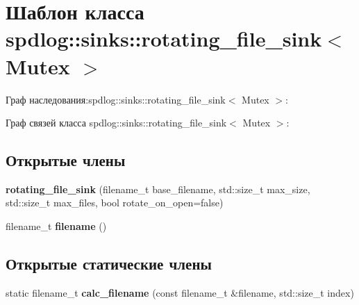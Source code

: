 \hypertarget{classspdlog_1_1sinks_1_1rotating__file__sink}{}\section{Шаблон класса spdlog\+:\+:sinks\+:\+:rotating\+\_\+file\+\_\+sink$<$ Mutex $>$}
\label{classspdlog_1_1sinks_1_1rotating__file__sink}


Граф наследования\+:spdlog\+:\+:sinks\+:\+:rotating\+\_\+file\+\_\+sink$<$ Mutex $>$\+:


Граф связей класса spdlog\+:\+:sinks\+:\+:rotating\+\_\+file\+\_\+sink$<$ Mutex $>$\+:
\subsection*{Открытые члены}
\begin{DoxyCompactItemize}
\item 
\mbox{\label{classspdlog_1_1sinks_1_1rotating__file__sink_a54eea9d7675a75dd4cbf3d8eedebee60}} 
{\bfseries rotating\+\_\+file\+\_\+sink} (filename\+\_\+t base\+\_\+filename, std\+::size\+\_\+t max\+\_\+size, std\+::size\+\_\+t max\+\_\+files, bool rotate\+\_\+on\+\_\+open=false)
\item 
\mbox{\label{classspdlog_1_1sinks_1_1rotating__file__sink_a7c0a9c699bb8c3a59325d9498db4cdcc}} 
filename\+\_\+t {\bfseries filename} ()
\end{DoxyCompactItemize}
\subsection*{Открытые статические члены}
\begin{DoxyCompactItemize}
\item 
\mbox{\label{classspdlog_1_1sinks_1_1rotating__file__sink_a7dc60b7e4c92116f2cb2a41c6a2e1a01}} 
static filename\+\_\+t {\bfseries calc\+\_\+filename} (const filename\+\_\+t \&filename, std\+::size\+\_\+t index)
\end{DoxyCompactItemize}
